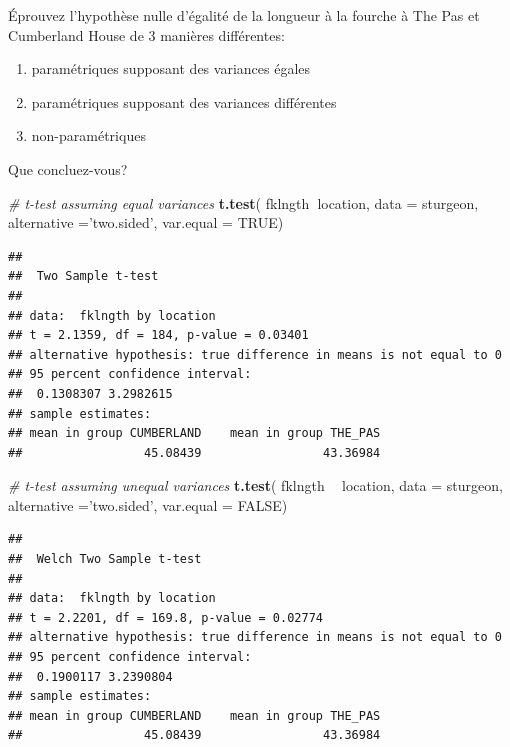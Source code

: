 \documentclass[12pt,]{book}
\newenvironment{Shaded}{\begin{snugshade}}{\end{snugshade}}
\newcommand{\CommentTok}[1]{\textcolor[rgb]{0.37,0.37,0.37}{\textit{#1}}}
\newcommand{\DataTypeTok}[1]{\textcolor[rgb]{0.27,0.27,0.27}{#1}}
\newcommand{\KeywordTok}[1]{\textcolor[rgb]{0.27,0.27,0.27}{\textbf{#1}}}
\newcommand{\NormalTok}[1]{#1}
\newcommand{\OperatorTok}[1]{\textcolor[rgb]{0.43,0.43,0.43}{\textbf{#1}}}
\newcommand{\OtherTok}[1]{\textcolor[rgb]{0.37,0.37,0.37}{#1}}
\newcommand{\StringTok}[1]{\textcolor[rgb]{0.5,0.5,0.5}{#1}}
\providecommand{\tightlist}{%
  \setlength{\itemsep}{0pt}\setlength{\parskip}{0pt}}
\begin{document}
Éprouvez l'hypothèse nulle d'égalité de la longueur à la fourche à The Pas et Cumberland House de 3 manières différentes:

\begin{enumerate}
\def\labelenumi{\arabic{enumi}.}
\tightlist
\item
  paramétriques supposant des variances égales
\item
  paramétriques supposant des variances différentes
\item
  non-paramétriques
\end{enumerate}

Que concluez-vous?

\begin{Shaded}
\begin{Highlighting}[]
\CommentTok{# t-test assuming equal variances}
 \KeywordTok{t.test}\NormalTok{(}
\NormalTok{   fklngth}\OperatorTok{~}\NormalTok{location, }\DataTypeTok{data =}\NormalTok{ sturgeon,}
   \DataTypeTok{alternative =}\StringTok{'two.sided'}\NormalTok{,}
   \DataTypeTok{var.equal =} \OtherTok{TRUE}\NormalTok{)}
\end{Highlighting}
\end{Shaded}

\begin{verbatim}
## 
## 	Two Sample t-test
## 
## data:  fklngth by location
## t = 2.1359, df = 184, p-value = 0.03401
## alternative hypothesis: true difference in means is not equal to 0
## 95 percent confidence interval:
##  0.1308307 3.2982615
## sample estimates:
## mean in group CUMBERLAND    mean in group THE_PAS 
##                 45.08439                 43.36984
\end{verbatim}

\begin{Shaded}
\begin{Highlighting}[]
\CommentTok{# t-test assuming unequal variances}
 \KeywordTok{t.test}\NormalTok{(}
\NormalTok{   fklngth }\OperatorTok{~}\StringTok{ }\NormalTok{location, }\DataTypeTok{data =}\NormalTok{ sturgeon,}
   \DataTypeTok{alternative =}\StringTok{'two.sided'}\NormalTok{,}
   \DataTypeTok{var.equal =} \OtherTok{FALSE}\NormalTok{)}
\end{Highlighting}
\end{Shaded}

\begin{verbatim}
## 
## 	Welch Two Sample t-test
## 
## data:  fklngth by location
## t = 2.2201, df = 169.8, p-value = 0.02774
## alternative hypothesis: true difference in means is not equal to 0
## 95 percent confidence interval:
##  0.1900117 3.2390804
## sample estimates:
## mean in group CUMBERLAND    mean in group THE_PAS 
##                 45.08439                 43.36984
\end{verbatim}
\end{document}
